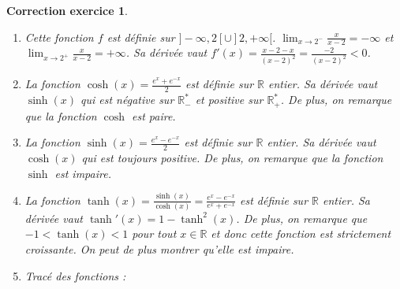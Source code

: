 \documentclass[12pt]{article}
\newtheorem{correction}{\bf Correction exercice}
\newenvironment{cor}{
\begin{correction}\smallskip\normalfont}{\end{correction}
}
\newcommand*{\R}{\mathbb{R}}
\newif\ifcorrige\corrigetrue
\begin{document}
\ifcorrige
\color{magenta}
\begin{cor}
$\qquad$
\begin{enumerate}
\item Cette fonction $f$ est d\'efinie sur $]-\infty,2[\cup]2,+\infty[$.
  $\lim_{x \to 2^-} \frac{x}{x-2} = - \infty$
  et $\lim_{x \to 2^+} \frac{x}{x-2} = + \infty$.
  Sa d\'eriv\'ee vaut
  $f'(x) = \frac{x-2 - x}{(x-2)^2} = \frac{-2}{(x-2)^2} < 0$.

\item La fonction $\cosh(x) = \frac{e^x + e^{-x}}{2}$ est d\'efinie sur $\R$ entier.
  Sa d\'eriv\'ee vaut $\sinh(x)$ qui est n\'egative sur $\R_-^*$ et positive sur $\R_+^*$.
  De plus, on remarque que la fonction $\cosh$ est paire.

\item La fonction $\sinh(x) = \frac{e^x - e^{-x}}{2}$ est d\'efinie sur $\R$ entier.
  Sa d\'eriv\'ee vaut $\cosh(x)$ qui est toujours positive.
  De plus, on remarque que la fonction $\sinh$ est impaire.

\item La fonction $\tanh(x) = \frac{\sinh(x)}{\cosh(x)} = \frac{e^x - e^{-x}}{e^x + e^{-x}}$
  est d\'efinie sur $\R$ entier.
  Sa d\'eriv\'ee vaut $\tanh'(x) = 1 - \tanh^2(x)$.
  De plus, on remarque que $-1 < \tanh(x) < 1$ pour tout $x \in \R$
  et donc cette fonction est strictement croissante.
  On peut de plus montrer qu'elle est impaire.

\item Trac\'e des fonctions :
    \begin{center}
\end{center}
\end{enumerate}
\end{cor}
\color{black}
\fi

\end{document}
